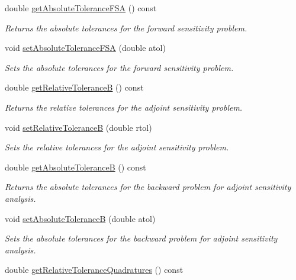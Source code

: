 \begin{DoxyCompactItemize}
double \mbox{\hyperlink{classamici_1_1_solver_ac4b72ec37a7ab41b520b5c540a382165}{get\+Absolute\+Tolerance\+F\+SA}} () const
\begin{DoxyCompactList}\small\item\em Returns the absolute tolerances for the forward sensitivity problem. \end{DoxyCompactList}\item 
void \mbox{\hyperlink{classamici_1_1_solver_a96ccd686d0ce5c2c43071537e088e42a}{set\+Absolute\+Tolerance\+F\+SA}} (double atol)
\begin{DoxyCompactList}\small\item\em Sets the absolute tolerances for the forward sensitivity problem. \end{DoxyCompactList}\item 
double \mbox{\hyperlink{classamici_1_1_solver_ae62749d65b73e317be96b0556401f29d}{get\+Relative\+ToleranceB}} () const
\begin{DoxyCompactList}\small\item\em Returns the relative tolerances for the adjoint sensitivity problem. \end{DoxyCompactList}\item 
void \mbox{\hyperlink{classamici_1_1_solver_a63eaa8593d16c31cedbbd038925eff2d}{set\+Relative\+ToleranceB}} (double rtol)
\begin{DoxyCompactList}\small\item\em Sets the relative tolerances for the adjoint sensitivity problem. \end{DoxyCompactList}\item 
double \mbox{\hyperlink{classamici_1_1_solver_ac495bd9ff960704197bc5e48ef9ee5de}{get\+Absolute\+ToleranceB}} () const
\begin{DoxyCompactList}\small\item\em Returns the absolute tolerances for the backward problem for adjoint sensitivity analysis. \end{DoxyCompactList}\item 
void \mbox{\hyperlink{classamici_1_1_solver_a0d680ec1bec367b0708f664a760c13f1}{set\+Absolute\+ToleranceB}} (double atol)
\begin{DoxyCompactList}\small\item\em Sets the absolute tolerances for the backward problem for adjoint sensitivity analysis. \end{DoxyCompactList}\item 
double \mbox{\hyperlink{classamici_1_1_solver_a40124a6593fea7f5ddbf39385b021a9e}{get\+Relative\+Tolerance\+Quadratures}} () const

\end{DoxyCompactItemize}
